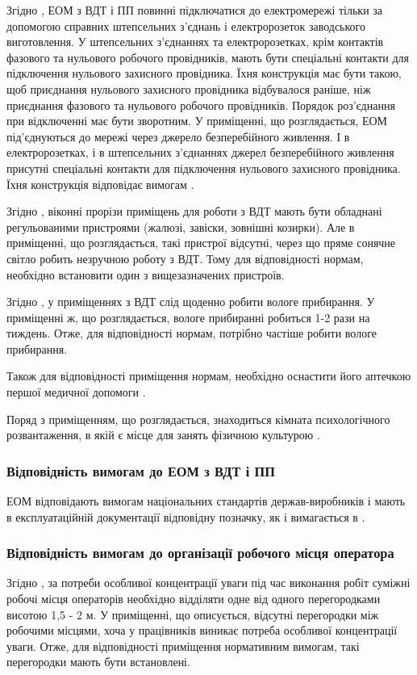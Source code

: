\documentclass[a4paper,12pt]{article}
\begin{document}
Згідно \cite{npaop1210}, ЕОМ з ВДТ і ПП повинні підключатися до електромережі тільки за допомогою справних штепсельних з'єднань і електророзеток заводського виготовлення. У штепсельних з'єднаннях та електророзетках, крім контактів фазового та нульового робочого провідників, мають бути спеціальні контакти для підключення нульового захисного провідника. Їхня конструкція має бути такою, щоб приєднання нульового захисного провідника відбувалося раніше, ніж приєднання фазового та нульового робочого провідників. Порядок роз'єднання при відключенні має бути зворотним. У приміщенні, що розглядається, ЕОМ під’єднуються до мережі через джерело безперебійного живлення. І в електророзетках, і в штепсельних з’єднаннях джерел безперебійного живлення присутні спеціальні контакти для підключення нульового захисного провідника. Їхня конструкція відповідає вимогам \cite{npaop1210}.

Згідно \cite{sanpin798}, віконні прорізи приміщень для роботи з ВДТ мають бути обладнані регульованими пристроями (жалюзі, завіски, зовнішні козирки). Але в приміщенні, що розглядається, такі пристрої відсутні, через що пряме сонячне світло робить незручною роботу з ВДТ. Тому для відповідності нормам, необхідно встановити один з вищезазначених пристроїв.

Згідно \cite{sanpin798}, у приміщеннях з ВДТ слід щоденно робити вологе прибирання. У приміщенні ж, що розглядається, вологе прибиранні робиться 1-2 рази на тиждень. Отже, для відповідності нормам, потрібно частіше робити вологе прибирання.

Також для відповідності приміщення нормам, необхідно оснастити його аптечкою першої медичної допомоги \cite{sanpin798}.

Поряд з приміщенням, що розглядається, знаходиться кімната психологічного розвантаження, в якій є місце для занять фізичною культурою \cite{snip}.

\subsubsection{Відповідність вимогам до ЕОМ з ВДТ і ПП}
ЕОМ відповідають вимогам національних стандартів держав-виробників і мають в експлуатаційній документації відповідну позначку, як і вимагається в \cite{npaop1210}.

\subsubsection{Відповідність вимогам до організації робочого місця оператора}
Згідно \cite{npaop1210}, за потреби особливої концентрації уваги під час виконання робіт суміжні робочі місця операторів необхідно відділяти одне від одного перегородками висотою 1,5 - 2 м. У приміщенні, що описується, відсутні перегородки між робочими місцями, хоча у працівників виникає потреба особливої концентрації уваги. Отже, для відповідності приміщення нормативним вимогам, такі перегородки мають бути встановлені.
\end{document}
